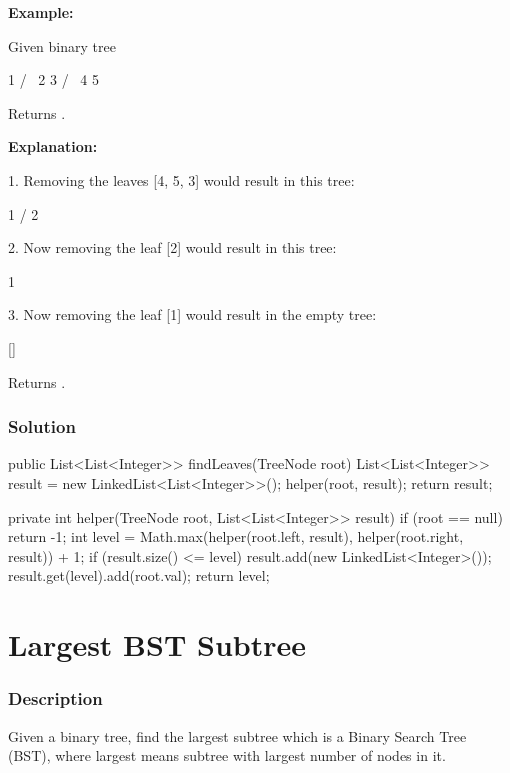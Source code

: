 \textbf{Example:}

Given binary tree
\begin{Code}
          1
         / \
        2   3
       / \
      4   5
\end{Code}

Returns \code{[4, 5, 3], [2], [1]}.

\textbf{Explanation:}

1. Removing the leaves [4, 5, 3] would result in this tree:
\begin{Code}
          1
         /
        2
\end{Code}

2. Now removing the leaf [2] would result in this tree:

          1

3. Now removing the leaf [1] would result in the empty tree:

          []

Returns \code{[4, 5, 3], [2], [1]}.

\subsubsection{Solution}

\begin{Code}
public List<List<Integer>> findLeaves(TreeNode root) {
    List<List<Integer>> result = new LinkedList<List<Integer>>();
    helper(root, result);
    return result;
}

private int helper(TreeNode root, List<List<Integer>> result) {
    if (root == null) {
        return -1;
    }
    int level = Math.max(helper(root.left, result), helper(root.right, result)) + 1;
    if (result.size() <= level) {
        result.add(new LinkedList<Integer>());
    }
    result.get(level).add(root.val);
    return level;
}
\end{Code}

\newpage

\section{Largest BST Subtree} %

\subsubsection{Description}
Given a binary tree, find the largest subtree which is a Binary Search Tree (BST), where largest means subtree with largest number of nodes in it.


